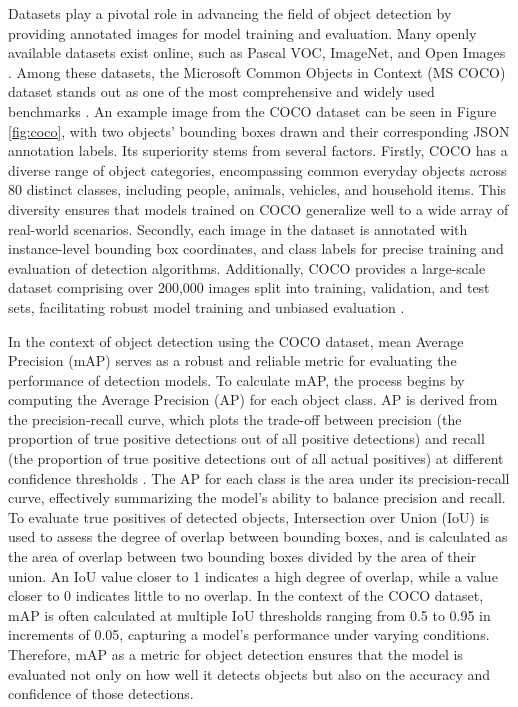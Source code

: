 \documentclass[journal,onecolumn,12pt]{IEEEtran}
\begin{document}
Datasets play a pivotal role in advancing the field of object detection by providing annotated images for model training and evaluation. Many openly available datasets exist online, such as Pascal VOC, ImageNet, and Open Images \cite{zaidi2021survey}. Among these datasets, the Microsoft Common Objects in Context (MS COCO) dataset stands out as one of the most comprehensive and widely used benchmarks \cite{lin2015microsoft}. An example image from the COCO dataset can be seen in Figure \ref{fig:coco}, with two objects' bounding boxes drawn and their corresponding JSON annotation labels. Its superiority stems from several factors. Firstly, COCO has a diverse range of object categories, encompassing common everyday objects across 80 distinct classes, including people, animals, vehicles, and household items. This diversity ensures that models trained on COCO generalize well to a wide array of real-world scenarios. Secondly, each image in the dataset is annotated with instance-level bounding box coordinates, and class labels for precise training and evaluation of detection algorithms. Additionally, COCO provides a large-scale dataset comprising over 200,000 images split into training, validation, and test sets, facilitating robust model training and unbiased evaluation \cite{lin2015microsoft}.

In the context of object detection using the COCO dataset, mean Average Precision (mAP) serves as a robust and reliable metric for evaluating the performance of detection models. To calculate mAP, the process begins by computing the Average Precision (AP) for each object class. AP is derived from the precision-recall curve, which plots the trade-off between precision (the proportion of true positive detections out of all positive detections) and recall (the proportion of true positive detections out of all actual positives) at different confidence thresholds \cite{map}. The AP for each class is the area under its precision-recall curve, effectively summarizing the model's ability to balance precision and recall. To evaluate true positives of detected objects, Intersection over Union (IoU) is used to assess the degree of overlap between bounding boxes, and is calculated as the area of overlap between two bounding boxes divided by the area of their union. An IoU value closer to 1 indicates a high degree of overlap, while a value closer to 0 indicates little to no overlap. In the context of the COCO dataset, mAP is often calculated at multiple IoU thresholds ranging from 0.5 to 0.95 in increments of 0.05, capturing a model's performance under varying conditions. Therefore, mAP as a metric for object detection ensures that the model is evaluated not only on how well it detects objects but also on the accuracy and confidence of those detections.
\end{document}
